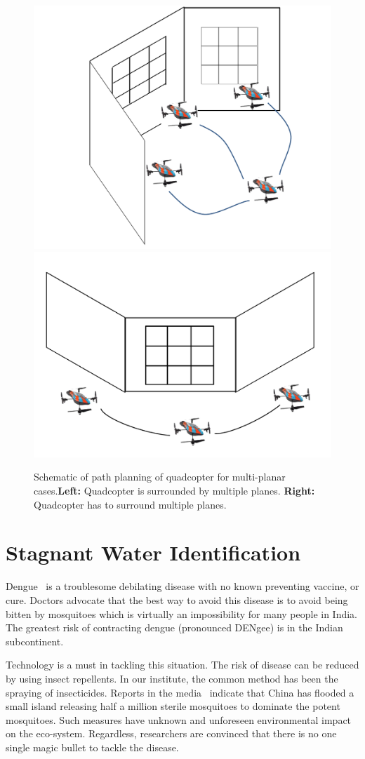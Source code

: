 \documentclass[11pt]{article}
\begin{document}
\begin{figure}[h!]
\centering
\includegraphics[width=0.45\linewidth]{furtherWork/pathInner}
\includegraphics[width=0.45\linewidth]{furtherWork/pathOuter}
\caption{Schematic of path planning of quadcopter for multi-planar
cases.\textbf{Left:} Quadcopter is surrounded by multiple planes. 
\textbf{Right:} Quadcopter has to surround multiple planes.}
\label{fig:pathInnerOuter}
\end{figure}

\section{Stagnant Water Identification}

Dengue~\cite{WHO15Dengue} is a troublesome debilating disease with no
known preventing vaccine, or cure. Doctors advocate that the best way
to avoid this disease is to avoid being bitten by mosquitoes which is
virtually an impossibility for many people in India.  The greatest
risk of contracting dengue (pronounced DENgee) is in the Indian
subcontinent.  

Technology is a must in tackling this situation.  The risk of disease
can be reduced by using insect repellents. In our institute, the
common method has been the spraying of insecticides.  Reports in the
media~\cite{china} indicate that China has flooded a small island
releasing half a million sterile mosquitoes to dominate the potent
mosquitoes. Such measures have unknown and unforeseen environmental
impact on the eco-system. Regardless, researchers are convinced that
there is no one single magic bullet to tackle the disease. 
\end{document}
